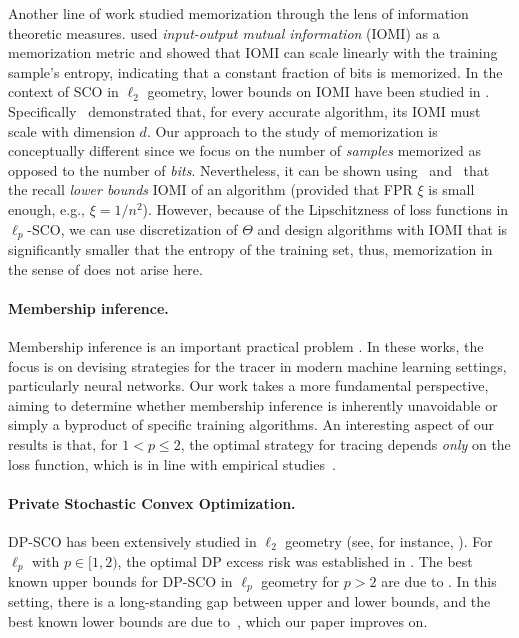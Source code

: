 Another line of work studied memorization through the lens of information theoretic measures. \citet{brown2021memorization} used \emph{input-output mutual information} (IOMI) as a memorization metric and showed that IOMI can scale linearly with the training sample's entropy, indicating that a constant fraction of bits is memorized. 
In the context of SCO in $\ell_2$ geometry, lower bounds on IOMI have been studied in \cite{haghifam23limitations,livni2024information}. Specifically~\cite{livni2024information} demonstrated that, for every accurate algorithm, its IOMI must scale with dimension $d$. Our approach to the study of memorization is conceptually different since we focus on the number of \emph{samples} memorized as opposed to the number of \emph{bits}. 
Nevertheless, it can be shown using~ and~\cite[Thm.~2.1]{haghifam2020sharpened} that the recall \emph{lower bounds} IOMI of an algorithm (provided that FPR $\xi$ is small enough, e.g., $\xi = 1/n^2$). However, because of the Lipschitzness of loss functions in $\ell_p$-SCO, we can use discretization of $\Theta$ and design algorithms with IOMI that is significantly smaller that the entropy of the training set, thus, memorization in the sense of \cite{brown2021memorization} does not arise here. 

\paragraph{Membership inference.} Membership inference is an important practical problem \citep{homer2008resolving, shokri2017membership, carlini2022membership}. In these works, the focus is on devising strategies for the tracer in modern machine learning settings, particularly neural networks. Our work takes a more fundamental perspective, aiming to determine whether membership inference is inherently unavoidable or simply a byproduct of specific training algorithms. An interesting aspect of our results is that, for $1 < p \le 2$, the optimal strategy for tracing depends \emph{only} on the loss function, which is in line with empirical studies~\citep{sablayrolles2019white}. 



\paragraph{Private Stochastic Convex Optimization.}
DP-SCO has been extensively studied in $\ell_2$ geometry (see, for instance, \citep{chaudhuri2011differentially,bassily2014private,bassily2019private,feldman2020private}). For $\ell_p$ with $p \in [1,2)$, the optimal DP excess risk was established in \citep{asi2021private,bassily2021non}. The best known upper bounds for DP-SCO in $\ell_p$ geometry for $p>2$ are due to \citep{bassily2021non,gopi2023private}. In this setting, there is a long-standing gap between upper and lower bounds, and the best known lower bounds are due to~\cite{arora2022differentially,lee2024powersamplingdimensionfreerisk}, which our paper improves on.  

